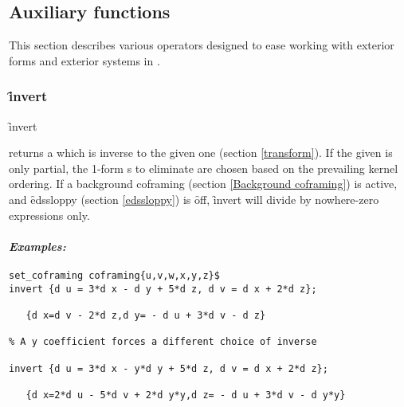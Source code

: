 
\subsection{Auxiliary functions}
\label{Auxiliary functions}

This section describes various operators designed to ease working with
exterior forms and exterior systems in \REDUCE.

\subsubsection{\f{invert}}
\label{invert}

\hypertarget{operator:EDS_INVERT}{}
\begin{syntax}
	\f{invert} 
\end{syntax}
returns a  which is inverse to the given one (section
\ref{transform}). If the  given is only partial, the
1-form s to eliminate are chosen based on the prevailing
kernel ordering. If a background coframing (section \ref{Background
coframing}) is active, and \f{edssloppy} (section \ref{edssloppy}) is
\f{off}, \f{invert} will divide by nowhere-zero expressions only.

\paragraph{\textit{Examples:}}
\begin{verbatim}
set_coframing coframing{u,v,w,x,y,z}$
invert {d u = 3*d x - d y + 5*d z, d v = d x + 2*d z};

   {d x=d v - 2*d z,d y= - d u + 3*d v - d z}

% A y coefficient forces a different choice of inverse

invert {d u = 3*d x - y*d y + 5*d z, d v = d x + 2*d z};

   {d x=2*d u - 5*d v + 2*d y*y,d z= - d u + 3*d v - d y*y}
\end{verbatim}


%

